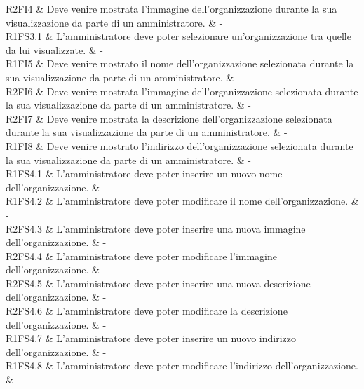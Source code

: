 R2FI4 & Deve venire mostrata l'immagine dell'organizzazione durante la sua visualizzazione da parte di un amministratore.  & - \\

R1FS3.1 & L'amministratore deve poter selezionare un'organizzazione tra quelle da lui visualizzate.  & - \\

R1FI5 & Deve venire mostrato il nome dell'organizzazione selezionata durante la sua visualizzazione da parte di un amministratore. & - \\

R2FI6 & Deve venire mostrata l'immagine dell'organizzazione selezionata durante la sua visualizzazione da parte di un amministratore.  & - \\

R2FI7 & Deve venire mostrata la descrizione dell'organizzazione selezionata durante la sua visualizzazione da parte di un amministratore. & - \\

R1FI8 & Deve venire mostrato l'indirizzo dell'organizzazione selezionata durante la sua visualizzazione da parte di un amministratore.  & - \\

R1FS4.1 & L'amministratore deve poter inserire un nuovo nome dell'organizzazione. & - \\

R1FS4.2 & L'amministratore deve poter modificare il nome dell'organizzazione. & - \\

R2FS4.3 & L'amministratore deve poter inserire una nuova immagine dell'organizzazione. & - \\

R2FS4.4 & L'amministratore deve poter modificare l'immagine dell'organizzazione. & - \\

R2FS4.5 & L'amministratore deve poter inserire una nuova descrizione dell'organizzazione.  & - \\

R2FS4.6 & L'amministratore deve poter modificare la descrizione dell'organizzazione.  & - \\

R1FS4.7 & L'amministratore deve poter inserire un nuovo indirizzo dell'organizzazione. & - \\

R1FS4.8 & L'amministratore deve poter modificare l'indirizzo dell'organizzazione.  & - \\

